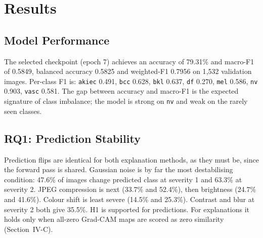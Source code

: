 \documentclass[conference]{IEEEtran}
\begin{document}
\section{Results}

\subsection{Model Performance}
The selected checkpoint (epoch 7) achieves an accuracy of 79.31\% and macro-F1
of 0.5849, balanced accuracy 0.5825 and weighted-F1 0.7956 on 1{,}532
validation images. Per-class F1 is: \texttt{akiec} 0.491, \texttt{bcc}
0.628, \texttt{bkl} 0.637, \texttt{df} 0.270, \texttt{mel} 0.586,
\texttt{nv} 0.903, \texttt{vasc} 0.581. The gap between accuracy and
macro-F1 is the expected signature of class imbalance; the model is strong
on \texttt{nv} and weak on the rarely seen classes.

\subsection{RQ1: Prediction Stability}
Prediction flips are identical for both explanation methods, as they must
be, since the forward pass is shared. Gaussian noise is by far the most
destabilising condition: 47.6\% of images change predicted class at
severity 1 and 63.3\% at severity 2. JPEG compression is next (33.7\% and
52.4\%), then brightness (24.7\% and 41.6\%). Colour shift is least severe
(14.5\% and 25.3\%). Contrast and blur at severity 2 both give 35.5\%.
H1 is supported for predictions. For explanations it holds only when all-zero
Grad-CAM maps are scored as zero similarity (Section~IV-C).
\end{document}
